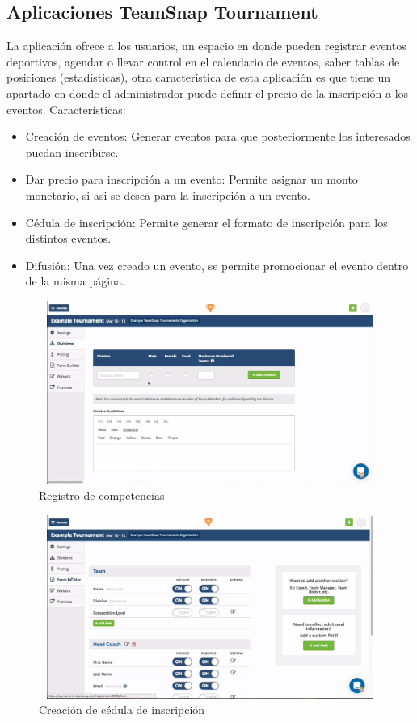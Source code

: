 \subsection{Aplicaciones TeamSnap Tournament}
\noindent La aplicación ofrece a los usuarios, un espacio en donde pueden registrar eventos deportivos, agendar o llevar control en el calendario de eventos, saber tablas de posiciones (estadísticas), otra característica de esta aplicación es que tiene un apartado en donde el administrador puede definir el precio de la inscripción a los eventos. \cite{team}
Características: 
\begin{itemize}
	\item Creación de eventos: Generar eventos para que posteriormente los interesados puedan inscribirse.
	\item Dar precio para inscripción a un evento: Permite asignar un monto monetario, si asi se desea para la inscripción a un evento.
	\item Cédula de inscripción: Permite generar el formato de inscripción para los distintos eventos.
	\item Difusión: Una vez creado un evento, se permite promocionar el evento dentro de la misma página.
\end{itemize}
\begin{figure}[hbt]
	\centering
	\includegraphics[width=12cm, height=6cm]{Imagenes/Aplicaciones/TsT1.png}
	\caption{Registro de competencias}
		\label{Imagen}
\end{figure}
\pagebreak
\begin{figure}[hbt]
	\centering
	\includegraphics[width=12cm, height=6cm]{Imagenes/Aplicaciones/TsT2.png}
	\caption{Creación de cédula de inscripción}
\end{figure}

